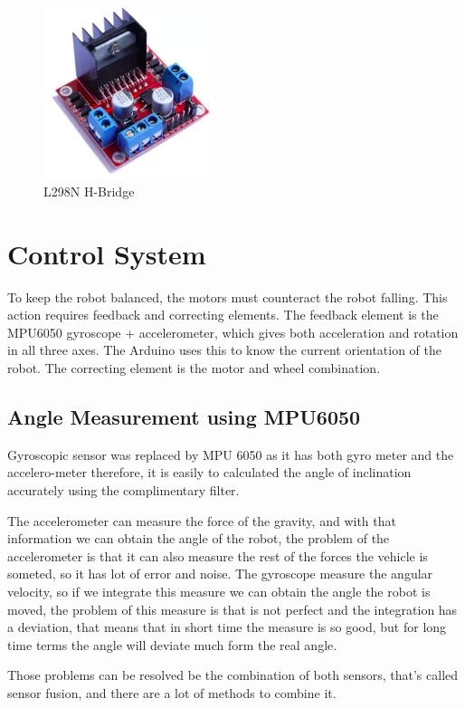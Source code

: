 \documentclass{article}
\begin{document}
 	\begin{figure}[h]
 		\centering
 		\includegraphics[width=50mm,scale=0.5]{L298N}
 		\caption{L298N H-Bridge}
 		\label{Fig.5:L298N H-Bridge}
 	\end{figure}
 
 	\pagebreak
 	
 	\section{Control System}
 	
 	To keep the robot balanced, the motors must counteract the robot falling. This action requires feedback and correcting elements. The feedback element is the MPU6050 gyroscope + accelerometer, which gives both acceleration and rotation in all three axes. The Arduino uses this to know the current orientation of the robot. The correcting element is the motor and wheel combination. 
 	
 	\subsection{Angle Measurement using MPU6050}
 	Gyroscopic sensor was replaced by MPU 6050 as it has both gyro meter and the accelero-meter therefore, it is easily to calculated the angle of inclination accurately using the complimentary filter. 
 	
 	The accelerometer can measure the force of the gravity, and with that information we can obtain the angle of the robot, the problem of the accelerometer is that it can also measure the rest of the forces the vehicle is someted, so it has lot of error and noise. The gyroscope measure the angular velocity, so if we integrate this measure we can obtain the angle the robot is moved, the problem of this measure is that is not perfect and the integration has a deviation, that means that in short time the measure is so good, but for long time terms the angle will deviate much form the real angle.

Those problems can be resolved be the combination of both sensors, that's called sensor fusion, and there are a lot of methods to combine it. 
 	
\end{document}
